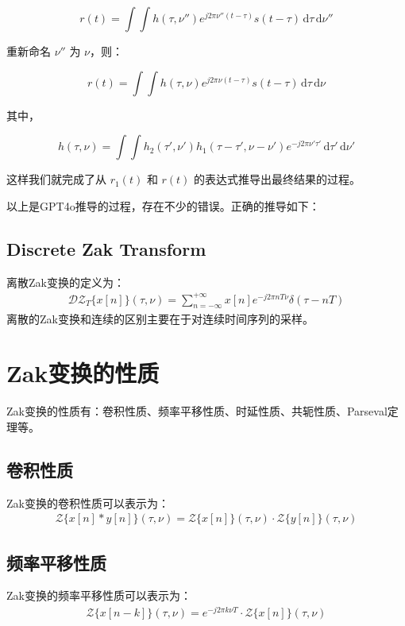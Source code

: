 \documentclass[12pt,a4paper]{article}%
\begin{document}
\[
r(t) = \int\int h(\tau,\nu'') e^{j2\pi\nu''(t-\tau)} s(t-\tau) \, \mathrm{d}\tau \, \mathrm{d}\nu''
\]

重新命名 \(\nu''\) 为 \(\nu\)，则：

\[
r(t) = \int\int h(\tau,\nu) e^{j2\pi\nu(t-\tau)} s(t-\tau) \, \mathrm{d}\tau \, \mathrm{d}\nu
\]

其中，

\[
h(\tau,\nu) = \int \int h_2(\tau',\nu') h_1(\tau - \tau', \nu - \nu') e^{-j2\pi\nu'\tau'} \, \mathrm{d}\tau' \, \mathrm{d}\nu'
\]

这样我们就完成了从 \( r_1(t) \) 和 \( r(t) \) 的表达式推导出最终结果的过程。

以上是GPT4o推导的过程，存在不少的错误。正确的推导如下：
\subsection{Discrete Zak Transform}
	离散Zak变换的定义为：
	\begin{equation}
		\label{eq11.1}
		\begin{aligned}
			\mathcal{DZ}_T\{x[n]\}(\tau,\nu)=\sum_{n=-\infty}^{+\infty}x[n]e^{-j2\pi nT\nu}\delta(\tau-nT)
		\end{aligned}
	\end{equation}
	离散的Zak变换和连续的区别主要在于对连续时间序列的采样。
	\section{Zak变换的性质}%
	Zak变换的性质有：卷积性质、频率平移性质、时延性质、共轭性质、Parseval定理等。

	\subsection{卷积性质}
	Zak变换的卷积性质可以表示为：
	\begin{equation}
	\label{eq8}
	\begin{aligned}
	\mathcal{Z}\{x[n]*y[n]\}(\tau, \nu) = \mathcal{Z}\{x[n]\}(\tau, \nu) \cdot \mathcal{Z}\{y[n]\}(\tau, \nu)
	\end{aligned}
	\end{equation}

	\subsection{频率平移性质}
	Zak变换的频率平移性质可以表示为：
	\begin{equation}
	\label{eq9}
	\begin{aligned}
	\mathcal{Z}\{x[n-k]\}(\tau, \nu) = e^{-j2\pi k\nu T} \cdot \mathcal{Z}\{x[n]\}(\tau, \nu)
	\end{aligned}
	\end{equation}
\end{document}
